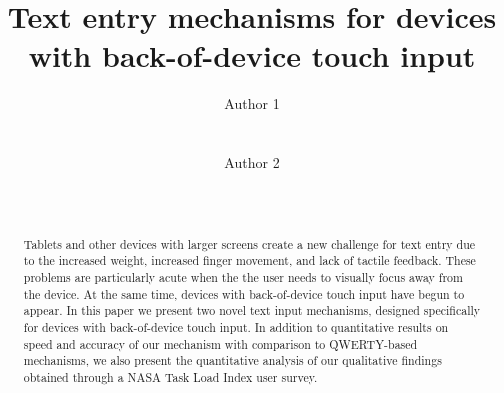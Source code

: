 \documentclass{chi2011}
\begin{document}
\setlength{\paperheight}{11in}
\setlength{\paperwidth}{8.5in}
\setlength{\pdfpageheight}{\paperheight}
\setlength{\pdfpagewidth}{\paperwidth}


\title{Text entry mechanisms for devices with back-of-device touch input}
\author{
  \alignauthor Author 1\\
    \\
    \\
  \alignauthor Author 2\\
    \\
    \\
}

\maketitle

\begin{abstract}
  Tablets and other devices with larger screens create a new challenge for
  text entry due to the increased weight, increased finger movement,
  and lack of tactile feedback.  These problems are particularly acute
  when the the user needs to visually focus away from the device. At
  the same time, devices with back-of-device touch input have begun to appear.  In this paper we present two novel text input mechanisms, designed specifically for
  devices with back-of-device touch input.  In addition to quantitative
  results on speed and accuracy of our mechanism with comparison to
  QWERTY-based mechanisms, we also present the quantitative analysis
  of our qualitative findings obtained through a NASA Task Load Index
  user survey.
\end{abstract}







%


\end{document}
